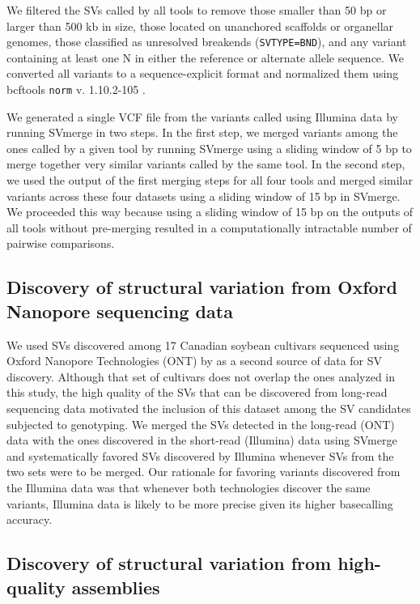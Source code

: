 \documentclass[12pt]{article}
\begin{document}
We filtered the SVs called by all tools to remove those smaller than 50 bp or
larger than 500 kb in size, those located on unanchored scaffolds or organellar
genomes, those classified as unresolved breakends (\texttt{SVTYPE=BND}), and
any variant containing at least one N in either the reference or alternate
allele sequence.  We converted all variants to a sequence-explicit format and
normalized them using bcftools \texttt{norm} v. 1.10.2-105
\citep{li2009-samtools}.

We generated a single VCF file from the variants called using Illumina data by
running SVmerge \citep{wong2010} in two steps. In the first step, we merged
variants among the ones called by a given tool by running SVmerge using a
sliding window of 5 bp to merge together very similar variants called by the
same tool. In the second step, we used the output of the first merging steps
for all four tools and merged similar variants across these four datasets using
a sliding window of 15 bp in SVmerge.  We proceeded this way because using a
sliding window of 15 bp on the outputs of all tools without pre-merging
resulted in a computationally intractable number of pairwise comparisons.

\subsection{Discovery of structural variation from Oxford Nanopore sequencing data}
\label{sv-gwas-sv-discovery-ont}

We used SVs discovered among 17 Canadian soybean cultivars sequenced using
Oxford Nano\-pore Technologies (ONT) by \cite{lemay2022} as a second source of
data for SV discovery.  Although that set of cultivars does not overlap the
ones analyzed in this study, the high quality of the SVs that can be discovered
from long-read sequencing data motivated the inclusion of this dataset among
the SV candidates subjected to genotyping.  We merged the SVs detected in the
long-read (ONT) data with the ones discovered in the short-read (Illumina) data
using SVmerge and systematically favored SVs discovered by Illumina whenever
SVs from the two sets were to be merged.  Our rationale for favoring variants
discovered from the Illumina data was that whenever both technologies discover
the same variants, Illumina data is likely to be more precise given its higher
basecalling accuracy.

\subsection{Discovery of structural variation from high-quality assemblies}
\label{sv-gwas-sv-discovery-assembly}
\end{document}
